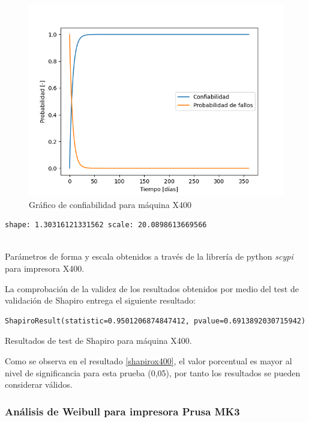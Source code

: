 \begin{figure}[H]
\centering
\includegraphics[scale=0.9]{images/confx350.png}
\caption{Gráfico de confiabilidad para máquina X400}
\label{confx350}
\end{figure}


\begin{table}[H]
\begin{lstlisting}
shape: 1.30316121331562 scale: 20.0898613669566


\end{lstlisting}
\caption{Parámetros de forma y escala obtenidos a través de la librería de python \textit{scypi} para impresora X400.}
\end{table}

La comprobación de la validez de los resultados obtenidos por medio del test de validación de Shapiro  entrega el siguiente resultado:


\begin{table}[H]
\begin{lstlisting}
ShapiroResult(statistic=0.9501206874847412, pvalue=0.6913892030715942)

\end{lstlisting}
\caption{Resultados de test de Shapiro para máquina X400.}
\label{shapirox400}
\end{table}

Como se observa en el resultado \ref{shapirox400}, el valor porcentual es mayor al nivel de significancia para esta prueba (0,05), por tanto los resultados se pueden considerar válidos.


\subsubsection{Análisis de Weibull para impresora Prusa MK3}


